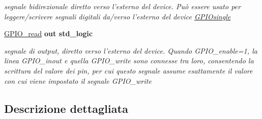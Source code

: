 \begin{DoxyCompactItemize}
\begin{DoxyCompactList}\small\item\em segnale bidirezionale diretto verso l'esterno del device. Può essere usato per leggere/scrivere segnali digitali da/verso l'esterno del device \hyperlink{class_g_p_i_osingle}{G\+P\+I\+Osingle} \end{DoxyCompactList}\item 
\hypertarget{group___g_p_i_o-single_ga4a6632a5d5cd6c4e6c1b634286795362}{\hyperlink{group___g_p_i_o-single_ga4a6632a5d5cd6c4e6c1b634286795362}{G\+P\+I\+O\+\_\+read}  {\bfseries {\bfseries \textcolor{vhdlchar}{out}\textcolor{vhdlchar}{ }}} {\bfseries \textcolor{vhdlchar}{std\+\_\+logic}\textcolor{vhdlchar}{ }} }\label{group___g_p_i_o-single_ga4a6632a5d5cd6c4e6c1b634286795362}

\begin{DoxyCompactList}\small\item\em segnale di output, diretto verso l'esterno del device. Quando G\+P\+I\+O\+\_\+enable=1, la linea G\+P\+I\+O\+\_\+inout e quella G\+P\+I\+O\+\_\+write sono connesse tra loro, consentendo la scrittura del valore dei pin, per cui questo segnale assume esattamente il valore con cui viene impostato il segnale G\+P\+I\+O\+\_\+write \end{DoxyCompactList}\end{DoxyCompactItemize}


\subsection{Descrizione dettagliata}
